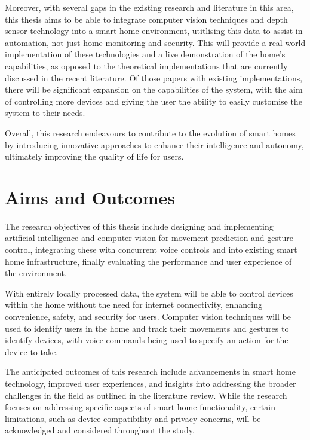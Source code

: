 Moreover, with several gaps in the existing research and literature in this area, this thesis aims to be able to integrate computer vision techniques and depth sensor technology into a smart home environment, utitlising this data to assist in automation, not just home monitoring and security.
This will provide a real-world implementation of these technologies and a live demonstration of the home's capabilities, as opposed to the theoretical implementations that are currently discussed in the recent literature.
Of those papers with existing implementations, there will be significant expansion on the capabilities of the system, with the aim of controlling more devices and giving the user the ability to easily customise the system to their needs.

Overall, this research endeavours to contribute to the evolution of smart homes by introducing innovative approaches to enhance their intelligence and autonomy, ultimately improving the quality of life for users.

\section{Aims and Outcomes}
The research objectives of this thesis include designing and implementing artificial intelligence and computer vision for movement prediction and gesture control, integrating these with concurrent voice controls and into existing smart home infrastructure, finally evaluating the performance and user experience of the environment.

With entirely locally processed data, the system will be able to control devices within the home without the need for internet connectivity, enhancing convenience, safety, and security for users.
Computer vision techniques will be used to identify users in the home and track their movements and gestures to identify devices, with voice commands being used to specify an action for the device to take.

The anticipated outcomes of this research include advancements in smart home technology, improved user experiences, and insights into addressing the broader challenges in the field as outlined in the literature review.
While the research focuses on addressing specific aspects of smart home functionality, certain limitations, such as device compatibility and privacy concerns, will be acknowledged and considered throughout the study.

